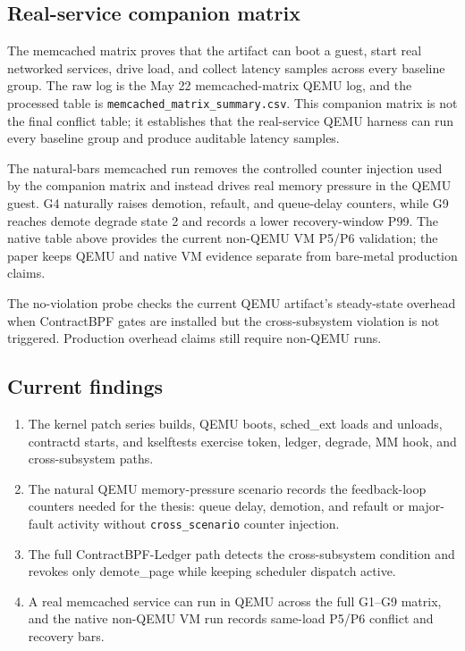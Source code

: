 \documentclass[letterpaper,twocolumn,10pt]{article}
\newcommand{\sys}{ContractBPF-Ledger\xspace}
\begin{document}
\subsection{Real-service companion matrix}



The memcached matrix proves that the artifact can boot a guest, start real
networked services, drive load, and collect latency samples across every
baseline group. The raw log is
the May 22 memcached-matrix QEMU log, and the processed table is
\texttt{memcached\_matrix\_summary.csv}. This companion matrix is not the final
conflict table; it establishes that the real-service QEMU harness can run every
baseline group and produce auditable latency samples.



The natural-bars memcached run removes the controlled counter injection used by
the companion matrix and instead drives real memory pressure in the QEMU guest.
G4 naturally raises demotion, refault, and queue-delay counters, while G9
reaches demote degrade state 2 and records a lower recovery-window P99. The
native table above provides the current non-QEMU VM P5/P6 validation; the paper
keeps QEMU and native VM evidence separate from bare-metal production claims.



The no-violation probe checks the current QEMU artifact's steady-state overhead
when ContractBPF gates are installed but the cross-subsystem violation is not
triggered. Production overhead claims still require non-QEMU runs.

\subsection{Current findings}

\begin{enumerate}[leftmargin=*]
    \item The kernel patch series builds, QEMU boots, sched\_ext loads and unloads, contractd starts, and kselftests exercise token, ledger, degrade, MM hook, and cross-subsystem paths.
    \item The natural QEMU memory-pressure scenario records the feedback-loop counters needed for the thesis: queue delay, demotion, and refault or major-fault activity without \texttt{cross\_scenario} counter injection.
    \item The full \sys path detects the cross-subsystem condition and revokes only demote\_page while keeping scheduler dispatch active.
    \item A real memcached service can run in QEMU across the full G1--G9 matrix, and the native non-QEMU VM run records same-load P5/P6 conflict and recovery bars.
\end{enumerate}
\end{document}
